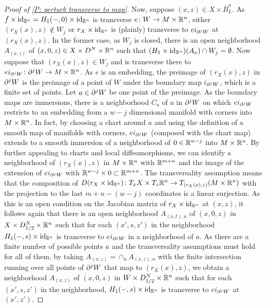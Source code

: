 \begin{proof}[Proof of \cref{P: perturb transverse to map}]
	Now, suppose $(x,z) \in X \times \bar B^n_L$.
	As $f \times \mathrm{id}_{\mathbb{R}^n} = H_1(-,0) \times \mathrm{id}_{\mathbb{R}^n}$ is transverse $e \colon W \to M \times \mathbb{R}^n$, either $(r_X(x),z)\notin W_j$ or $r_X \times \mathrm{id}_{\mathbb{R}^n}$ is (plainly) transverse to $ei_{\partial^jW}$ at $(r_X(x),z)$.
	In the former case, as $W_j$ is closed, there is an open neighborhood $A_{(x,z)}$ of $(x,0,z) \in X \times D^N \times \mathbb{R}^n$ such that $(H_1 \times \mathrm{id}_{\mathbb{R}^n})(A_x) \cap W_j = \emptyset$.
	Now suppose that $(r_X(x),z) \in W_j$ and is transverse there to $ei_{\partial^jW} \colon \partial^jW \to M \times \mathbb{R}^n$.
	As $e$ is an embedding, the preimage of $(r_X(x),z)$ in $\partial^jW$ is the preimage of a point of $W$ under the boundary map $i_{\partial^jW}$, which is a finite set of points.
	Let $a \in \partial^jW$ be one point of the preimage.
	As the boundary maps are immersions, there is a neighborhood $C_a$ of $a$ in $\partial^jW$ on which $ei_{\partial^jW}$ restricts to an embedding from a $w-j$ dimensional manifold with corners into $M \times \mathbb{R}^n$.
	In fact, by choosing a chart around $a$ and using the definition of a smooth map of manifolds with corners, $ei_{\partial^jW}$ (composed with the chart map) extends to a smooth immersion of a neighborhood of $0 \in \mathbb{R}^{w-j}$ into $M \times \mathbb{R}^n$.
	By further appealing to charts and local diffeomorphisms, we can identify a neighborhood of $(r_X(x),z)$ in $M \times \mathbb{R}^n$ with $\mathbb{R}^{m+n}$ and the image of the extension of $ei_{\partial^jW}$ with $\mathbb{R}^{w-j} \times 0 \subset \mathbb{R}^{m+n}$.
	The transversality assumption means that the composition of $D(r_X \times \mathrm{id}_{\mathbb{R}^n}) \colon T_xX \times T_z\mathbb{R}^n
	\to T_{(r_X(x),z)}(M \times \mathbb{R}^n)$ with the projection to the last $m+n-(w-j)$ coordinates is a linear surjection.
	As this is an open condition on the Jacobian matrix of $r_X \times \mathrm{id}_{\mathbb{R}^n}$ at $(x,z)$, it follows again that there is an open neighborhood $A_{(x,t),a}$ of $(x,0,z)$ in $X \times D_{1/2}^N \times \mathbb{R}^n$ such that for each $(x',s,z')$ in the neighborhood $H_1(-,s) \times \mathrm{id}_{\mathbb{R}^n}$ is transverse to $ei_{\partial^jW}$ in a neighborhood of $a$.
	As there are a finite number of possible points $a$ and the transversality assumptions must hold for all of them, by taking $A_{(x,z)} = \cap_a A_{(x,z),a}$ with the finite intersection running over all points of $\partial^jW$ that map to $(r_X(x),z)$, we obtain a neighborhood $A_{(x,z)}$ of $(x,0,z)$ in $W \times D_{1/2}^N \times \mathbb{R}^n$ such that for each $(x',s,z')$ in the neighborhood, $H_1(-,s) \times \mathrm{id}_{\mathbb{R}^n}$ is transverse to $ei_{\partial^jW}$ at $(x',z')$.


\end{proof}
